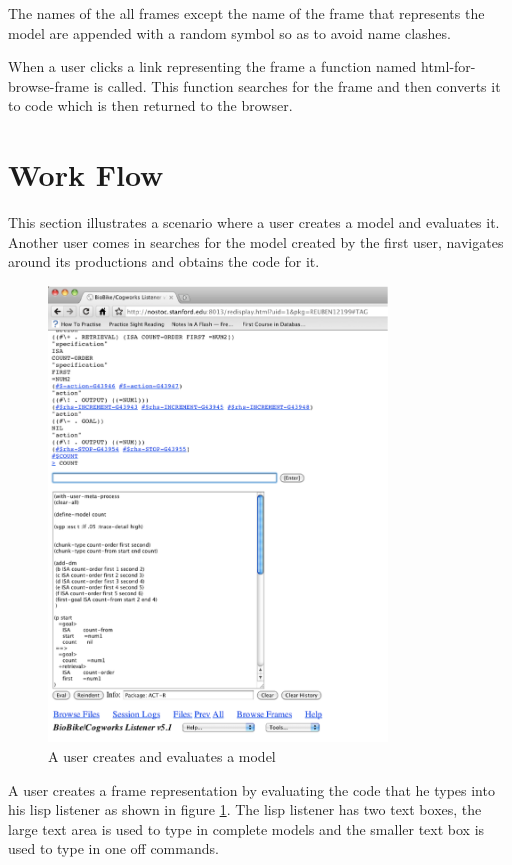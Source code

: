 The names of the all frames except the name of the frame that represents
the model are appended with a random symbol so as to avoid name
clashes. 


When a user clicks a link representing the frame a function named
html-for-browse-frame is called. This function searches for the frame
and then converts it to code which is then returned to the browser.


\section{Work Flow}

This section illustrates a scenario where a user creates a model and
evaluates it. Another user comes in searches for the model created by
the first user, navigates around its productions and obtains the code for
it. 

\begin{figure}[htp]
  \centering
  \includegraphics[width=90mm]{UserCreatesModel}
  \caption{A user creates and evaluates a model}
  \label{UserCreatesModel}
\end{figure}

A user creates a frame representation by evaluating the code that he
types into his lisp listener as shown in figure
\ref{UserCreatesModel}. The lisp listener has two text boxes, the
large text area is used to type in complete models and the smaller
text box is used to type in one off commands.

